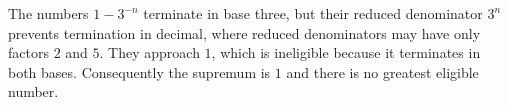 The numbers $ 1-3^{-n}$ terminate in base three, but their reduced denominator $ 3^n $ prevents termination in decimal, where reduced denominators may have only factors $ 2 $ and $ 5 $. They approach $ 1 $, which is ineligible because it terminates in both bases. Consequently the supremum is $\boxed1 $ and there is no greatest eligible number.

